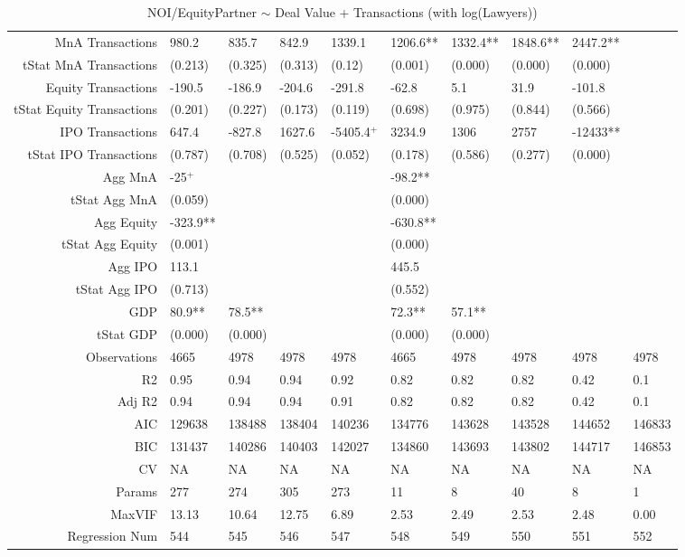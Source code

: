 \begin{table}[ht]
\begin{tabular}{rlllllllll}
  MnA Transactions & 980.2 & 835.7 & 842.9 & 1339.1 & 1206.6** & 1332.4** & 1848.6** & 2447.2** &  \\ 
  tStat MnA Transactions & (0.213) & (0.325) & (0.313) & (0.12) & (0.001) & (0.000) & (0.000) & (0.000) &  \\ 
  Equity Transactions & -190.5 & -186.9 & -204.6 & -291.8 & -62.8 & 5.1 & 31.9 & -101.8 &  \\ 
  tStat Equity Transactions & (0.201) & (0.227) & (0.173) & (0.119) & (0.698) & (0.975) & (0.844) & (0.566) &  \\ 
  IPO Transactions & 647.4 & -827.8 & 1627.6 & -5405.4$^{+}$ & 3234.9 & 1306 & 2757 & -12433** &  \\ 
  tStat IPO Transactions & (0.787) & (0.708) & (0.525) & (0.052) & (0.178) & (0.586) & (0.277) & (0.000) &  \\ 
  Agg MnA & -25$^{+}$ &  &  &  & -98.2** &  &  &  &  \\ 
  tStat Agg MnA & (0.059) &  &  &  & (0.000) &  &  &  &  \\ 
  Agg Equity & -323.9** &  &  &  & -630.8** &  &  &  &  \\ 
  tStat Agg Equity & (0.001) &  &  &  & (0.000) &  &  &  &  \\ 
  Agg IPO & 113.1 &  &  &  & 445.5 &  &  &  &  \\ 
  tStat Agg IPO & (0.713) &  &  &  & (0.552) &  &  &  &  \\ 
  GDP & 80.9** & 78.5** &  &  & 72.3** & 57.1** &  &  &  \\ 
  tStat GDP & (0.000) & (0.000) &  &  & (0.000) & (0.000) &  &  &  \\ 
  Observations & 4665 & 4978 & 4978 & 4978 & 4665 & 4978 & 4978 & 4978 & 4978 \\ 
  R2 & 0.95 & 0.94 & 0.94 & 0.92 & 0.82 & 0.82 & 0.82 & 0.42 & 0.1 \\ 
  Adj R2 & 0.94 & 0.94 & 0.94 & 0.91 & 0.82 & 0.82 & 0.82 & 0.42 & 0.1 \\ 
  AIC & 129638 & 138488 & 138404 & 140236 & 134776 & 143628 & 143528 & 144652 & 146833 \\ 
  BIC & 131437 & 140286 & 140403 & 142027 & 134860 & 143693 & 143802 & 144717 & 146853 \\ 
  CV & NA & NA & NA & NA & NA & NA & NA & NA & NA \\ 
  Params & 277 & 274 & 305 & 273 & 11 & 8 & 40 & 8 & 1 \\ 
  MaxVIF & 13.13 & 10.64 & 12.75 & 6.89 & 2.53 & 2.49 & 2.53 & 2.48 & 0.00 \\ 
  Regression Num & 544 & 545 & 546 & 547 & 548 & 549 & 550 & 551 & 552 \\ 
   \hline
\end{tabular}
\caption{NOI/EquityPartner $\sim$ Deal Value + Transactions (with log(Lawyers))} 
\end{table}
